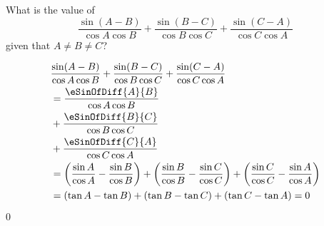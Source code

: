 

\question[2] What is the value of 
\[ \dfrac{\sin(A-B)}{\cos A\cos B} + \dfrac{\sin(B-C)}{\cos B\cos C} + \dfrac{\sin(C-A)}{\cos C\cos A} \]
given that $A\neq B\neq C$?

\begin{solution}[\halfpage]
  \begin{align}
     & \dfrac{\sin(A-B)}{\cos A\cos B} + \dfrac{\sin(B-C)}{\cos B\cos C} + \dfrac{\sin(C-A)}{\cos C\cos A}\nonumber\\
     &= \dfrac{\eSinOfDiff{A}{B}}{\cos A\cos B} \nonumber\\
     &+ \dfrac{\eSinOfDiff{B}{C}}{\cos B\cos C} \nonumber\\
     &+ \dfrac{\eSinOfDiff{C}{A}}{\cos C\cos A} \\ 
     &= \left(\dfrac{\sin A}{\cos A} - \dfrac{\sin B}{\cos B} \right) 
     + \left(\dfrac{\sin B}{\cos B } - \dfrac{\sin C}{\cos C} \right) 
     + \left(\dfrac{\sin C }{\cos C } - \dfrac{\sin A}{\cos A} \right) \\
     &= (\tan A - \tan B) + (\tan B - \tan C) + (\tan C - \tan A) = 0
  \end{align}
\end{solution}
\ifprintanswers\begin{codex}$0$\end{codex}\fi
